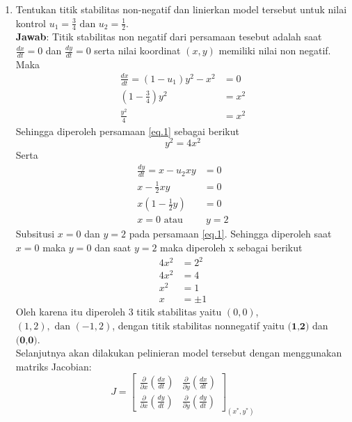 \documentclass{article}
\begin{document}
\begin{enumerate}[label=\alph*.]
    \item Tentukan titik stabilitas non-negatif dan linierkan model tersebut untuk nilai kontrol $u_1 = \frac{3}{4} \text{ dan } u_2=\frac{1}{2}$. \\
    \textbf{Jawab}: Titik stabilitas non negatif dari persamaan tesebut adalah saat $\frac{dx}{dt} = 0$ dan $\frac{dy}{dt} = 0$ serta nilai koordinat $(x,y)$ memiliki nilai non negatif. Maka
    \begin{align*}
        \frac{dx}{dt}=(1-u_1)y^2-x^2 &=0 \\
        (1-\frac{3}{4})y^2 &=x^2 \\
        \frac{y^2}{4}&=x^2
    \end{align*}
    Sehingga diperoleh persamaan \eqref{eq.1} sebagai berikut
    \begin{equation}
        y^2 =4x^2 \label{eq.1}
    \end{equation}
    Serta
    \begin{align*}
        \frac{dy}{dt} = x-u_2xy &=0 \\
        x-\frac{1}{2}xy &=0 \\
        x(1-\frac{1}{2}y)&=0\\
        x=0 \text{ atau}&\ y=2
    \end{align*}
    Subsitusi $x=0$ dan $y=2$ pada persamaan \eqref{eq.1}. Sehingga diperoleh saat $x=0$ maka $y=0$ dan saat $y=2$ maka diperoleh x sebagai berikut
    \begin{align*}
        4x^2 &=2^2 \\
        4x^2 &=4 \\
        x^2 &= 1 \\
        x &= \pm 1
    \end{align*}
    Oleh karena itu diperoleh 3 titik stabilitas yaitu $(0,0)$, $(1,2), \text{ dan } (-1,2)$, dengan titik stabilitas nonnegatif yaitu $\textbf{(1,2)}$ dan $\textbf{(0,0)}$. \\
    Selanjutnya akan dilakukan pelinieran model tersebut dengan menggunakan matriks Jacobian:
    \[
    J = 
    \begin{bmatrix}
    \frac{\partial}{\partial x}\left( \frac{dx}{dt} \right) & \frac{\partial}{\partial y}\left( \frac{dx}{dt} \right) \\
    \frac{\partial}{\partial x}\left( \frac{dy}{dt} \right) & \frac{\partial}{\partial y}\left( \frac{dy}{dt} \right)
    \end{bmatrix}_{(x^*,y^*)}
\]
\end{enumerate}
\end{document}
